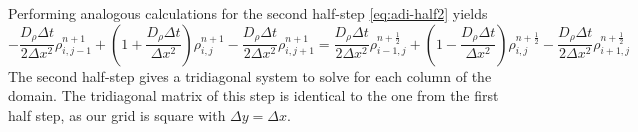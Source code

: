 \documentclass[a4paper]{article}
\begin{document}
Performing analogous calculations for the second half-step \ref{eq:adi-half2} yields
\begin{equation}
	-\frac{D_\rho \Delta t}{2 \Delta x^2} \rho_{i,j-1}^{n + 1} + \left( 1 + \frac{D_\rho \Delta t}{\Delta x^2} \right) \rho_{i,j}^{n + 1} - \frac{D_\rho \Delta t}{2 \Delta x^2} \rho_{i,j+1}^{n + 1} 
	= \frac{D_\rho \Delta t}{2 \Delta x^2} \rho_{i-1,j}^{n + \frac{1}{2}} + \left( 1 - \frac{D_\rho \Delta t}{\Delta x^2} \right) \rho_{i,j}^{n + \frac{1}{2}} - \frac{D_\rho \Delta t}{2 \Delta x^2} \rho_{i+1,j}^{n + \frac{1}{2}}
\end{equation}
The second half-step gives a tridiagonal system to solve for each column of the domain.
The tridiagonal matrix of this step is identical to the one from the first half step, as our grid is square with $\Delta y = \Delta x$.
\end{document}

